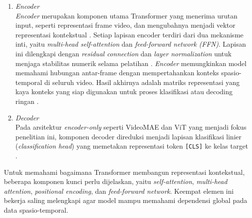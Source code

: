 \begin{enumerate}
	\item \textit{Encoder}\\
	\textit{Encoder} merupakan komponen utama Transformer yang menerima urutan input, seperti representasi frame video, dan mengubahnya menjadi vektor representasi kontekstual \cite{Vaswani2023}. Setiap lapisan encoder terdiri dari dua mekanisme inti, yaitu \textit{multi-head self-attention} dan \textit{feed-forward network (FFN)}. Lapisan ini dilengkapi dengan \textit{residual connection} dan \textit{layer normalization} untuk menjaga stabilitas numerik selama pelatihan \cite{IGoodfellow2016}. \textit{Encoder} memungkinkan model memahami hubungan antar-frame dengan mempertahankan konteks spasio-temporal di seluruh video. Hasil akhirnya adalah matriks representasi yang kaya konteks yang siap digunakan untuk proses klasifikasi atau decoding ringan \cite{Vaswani2023}.

	\item \textit{Decoder}\\
	Pada arsitektur \textit{encoder-only} seperti VideoMAE dan ViT yang menjadi fokus penelitian ini, komponen decoder direduksi menjadi lapisan klasifikasi linier (\textit{classification head}) yang memetakan representasi token \texttt{[CLS]} ke kelas target \cite{Dosovitskiy2021,Tong2022VideoMAE}.
\end{enumerate}

Untuk memahami bagaimana Transformer membangun representasi kontekstual, beberapa komponen kunci perlu dijelaskan, yaitu \textit{self-attention}, \textit{multi-head attention}, \textit{positional encoding}, dan \textit{feed-forward network}. Keempat elemen ini bekerja saling melengkapi agar model mampu memahami dependensi global pada data spasio-temporal.

